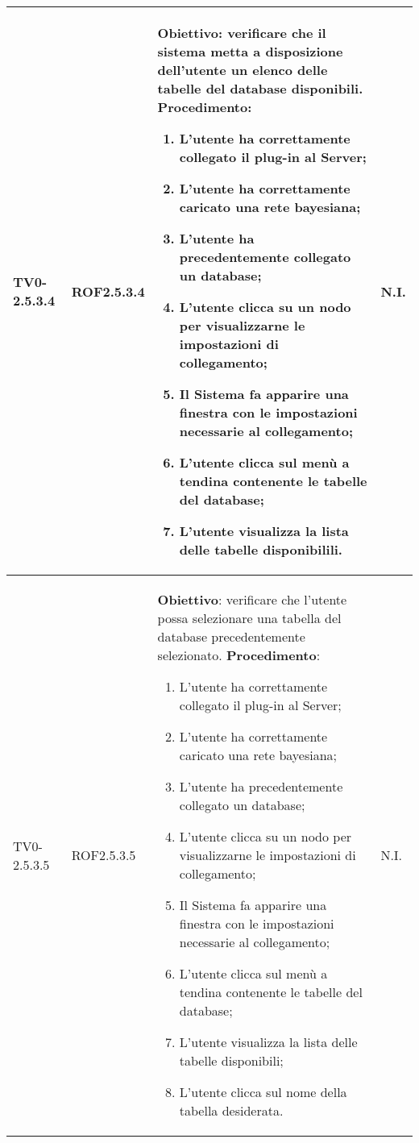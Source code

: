 \begin{longtable}{|C{.15\textwidth}|C{.13\textwidth}|m{.65\textwidth}|C{.08\textwidth}|}
TV0-2.5.3.4 & ROF2.5.3.4 &
	\textbf{Obiettivo}: verificare che il sistema metta a disposizione dell'utente un elenco delle tabelle del database disponibili. \newline
	\textbf{Procedimento}:
	\begin{enumerate}
		\item L'utente ha correttamente collegato il plug-in al Server;
		\item L'utente ha correttamente caricato una rete bayesiana;
		\item L'utente ha precedentemente collegato un database;
		\item L'utente clicca su un nodo per visualizzarne le impostazioni di collegamento;
		\item Il Sistema fa apparire una finestra con le impostazioni necessarie al collegamento;
		\item L'utente clicca sul menù a tendina contenente le tabelle del database;
		\item L'utente visualizza la lista delle tabelle disponibilili.
			\end{enumerate} & N.I. \\
\hline

TV0-2.5.3.5 & ROF2.5.3.5 &
	\textbf{Obiettivo}: verificare che l'utente possa selezionare una tabella del database precedentemente selezionato. \newline
	\textbf{Procedimento}:
	\begin{enumerate}
		\item L'utente ha correttamente collegato il plug-in al Server;
		\item L'utente ha correttamente caricato una rete bayesiana;
		\item L'utente ha precedentemente collegato un database;
		\item L'utente clicca su un nodo per visualizzarne le impostazioni di collegamento;
		\item Il Sistema fa apparire una finestra con le impostazioni necessarie al collegamento;
		\item L'utente clicca sul menù a tendina contenente le tabelle del database;
		\item L'utente visualizza la lista delle tabelle disponibili;
		\item L'utente clicca sul nome della tabella desiderata.
			\end{enumerate} & N.I. \\
\hline


\end{longtable}

